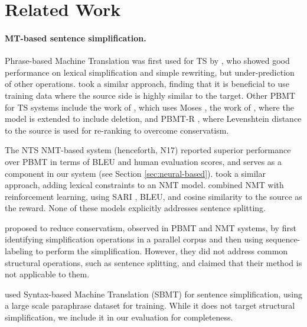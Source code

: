 \documentclass[11pt,a4paper]{article}
\begin{document}
\vspace{-0.2cm}
\section{Related Work}\label{sec:related_work}


\paragraph{MT-based sentence simplification.}
Phrase-based Machine Translation \citep[PBMT;][]{K03}
was first used for TS by \citet{S10}, who 
showed good performance on lexical simplification and simple rewriting,
but under-prediction of other operations. 
\citet{Sa15} took a similar approach, finding that it is beneficial to
use training data where the source side is highly similar to the target.
Other PBMT for TS systems include the work of \citet{CK11a}, which uses Moses \citep{K07}, the work of \citet{CK11b}, where the model is extended to include deletion,
and PBMT-R \citep{W12}, where Levenshtein distance to the source is
used for re-ranking to overcome conservatism.

The NTS NMT-based system \citep{Ni17} (henceforth, N17) reported superior performance over PBMT 
in terms of BLEU and human evaluation scores, 
and serves as a component in our system (see Section \ref{sec:neural-based}). 
\citet{Z17} took a similar approach, adding lexical constraints to an NMT model. 
\citet{ZL17} combined NMT with reinforcement learning, using SARI \citep{Xu16}, BLEU, and cosine similarity to the source as the reward.
None of these models explicitly addresses sentence splitting.

\citet{AM17} proposed to reduce conservatism, observed in PBMT and NMT systems, by first identifying simplification 
operations in a parallel corpus and then using sequence-labeling to perform the simplification. However, they did not 
address common structural operations, such as sentence splitting,
and claimed that their method is not applicable to them.

\citet{Xu16} used Syntax-based Machine Translation (SBMT) for sentence simplification,
using a large scale paraphrase dataset \citep{G13} for training. 
While it does not target structural simplification, we include it in our evaluation for completeness.

\vspace{-0.2cm}
\end{document}
